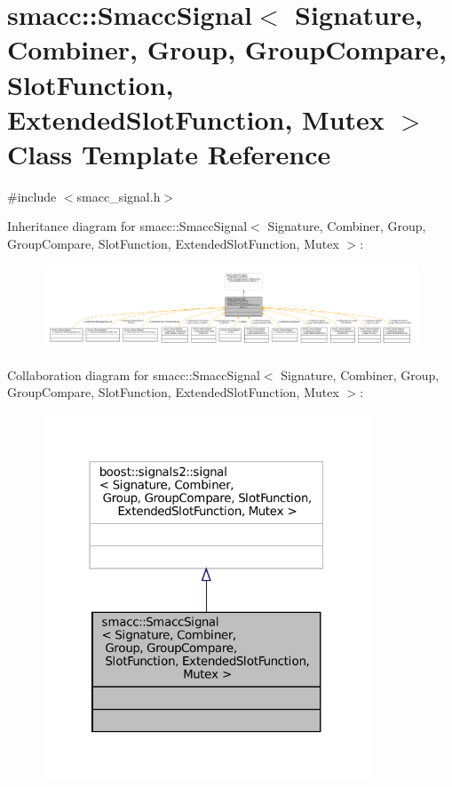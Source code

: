 \hypertarget{classsmacc_1_1SmaccSignal}{}\section{smacc\+:\+:Smacc\+Signal$<$ Signature, Combiner, Group, Group\+Compare, Slot\+Function, Extended\+Slot\+Function, Mutex $>$ Class Template Reference}
\label{classsmacc_1_1SmaccSignal}


{\ttfamily \#include $<$smacc\+\_\+signal.\+h$>$}



Inheritance diagram for smacc\+:\+:Smacc\+Signal$<$ Signature, Combiner, Group, Group\+Compare, Slot\+Function, Extended\+Slot\+Function, Mutex $>$\+:
\nopagebreak
\begin{figure}[H]
\begin{center}
\leavevmode
\includegraphics[width=350pt]{classsmacc_1_1SmaccSignal__inherit__graph}
\end{center}
\end{figure}


Collaboration diagram for smacc\+:\+:Smacc\+Signal$<$ Signature, Combiner, Group, Group\+Compare, Slot\+Function, Extended\+Slot\+Function, Mutex $>$\+:
\nopagebreak
\begin{figure}[H]
\begin{center}
\leavevmode
\includegraphics[width=277pt]{classsmacc_1_1SmaccSignal__coll__graph}
\end{center}
\end{figure}


